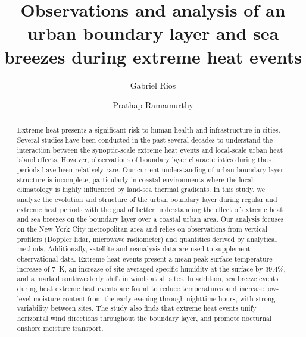 \documentclass[num-refs]{wiley-article}
\title{Observations and analysis of an urban boundary layer and sea breezes during extreme heat events}
\author[1\authfn{1}]{Gabriel Rios}
\author[2\authfn{1}]{Prathap Ramamurthy}
\affil[1]{Department of Mechanical Engineering, CUNY City College, New York, New York}
\affil[2]{NOAA Center for Earth System Sciences and Remote Sensing Technologies, New York, New York}
\begin{document}
\maketitle

\begin{abstract}
Extreme heat presents a significant risk to human health and infrastructure in cities. Several studies have been conducted in the past several decades to understand the interaction between the synoptic-scale extreme heat events and local-scale urban heat island effects. However, observations of boundary layer characteristics during these periods have been relatively rare. Our current understanding of urban boundary layer structure is incomplete, particularly in coastal environments where the local climatology is highly influenced by land-sea thermal gradients. In this study, we analyze the evolution and structure of the urban boundary layer during regular and extreme heat periods with the goal of better understanding the effect of extreme heat and sea breezes on the boundary layer over a coastal urban area. Our analysis focuses on the New York City metropolitan area and relies on observations from vertical profilers (Doppler lidar, microwave radiometer) and quantities derived by analytical methods. Additionally, satellite and reanalysis data are used to supplement observational data. Extreme heat events present a mean peak surface temperature increase of \SI{7}{\kelvin}, an increase of site-averaged specific humidity at the surface by 39.4\%, and a marked southwesterly shift in winds at all sites. In addition, sea breeze events during heat extreme heat events are found to reduce temperatures and increase low-level moisture content from the early evening through nighttime hours, with strong variability between sites. The study also finds that extreme heat events unify horizontal wind directions throughout the boundary layer, and promote nocturnal onshore moisture transport. 
\end{abstract}
\end{document}
